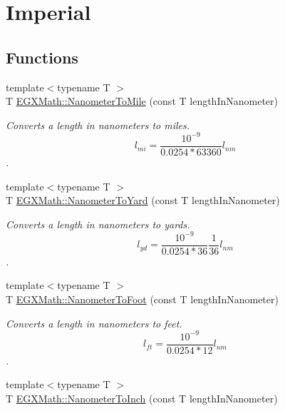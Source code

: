 \hypertarget{group___e_g_x_math-_conversions-_length_conversions-_nanometer-_imperial}{}\section{Imperial}
\label{group___e_g_x_math-_conversions-_length_conversions-_nanometer-_imperial}
\subsection*{Functions}
\begin{DoxyCompactItemize}
\item 
{\footnotesize template$<$typename T $>$ }\\T \mbox{\hyperlink{group___e_g_x_math-_conversions-_length_conversions-_nanometer-_imperial_gadbf1e269e14b8afcd128aa5534f28a5e}{E\+G\+X\+Math\+::\+Nanometer\+To\+Mile}} (const T length\+In\+Nanometer)
\begin{DoxyCompactList}\small\item\em Converts a length in nanometers to miles. \[ l_{mi}=\frac{10^{-9}}{0.0254 * 63360} l_{nm} \]. \end{DoxyCompactList}\item 
{\footnotesize template$<$typename T $>$ }\\T \mbox{\hyperlink{group___e_g_x_math-_conversions-_length_conversions-_nanometer-_imperial_ga1f2313a0bf1527690778a6dace0db853}{E\+G\+X\+Math\+::\+Nanometer\+To\+Yard}} (const T length\+In\+Nanometer)
\begin{DoxyCompactList}\small\item\em Converts a length in nanometers to yards. \[ l_{yd}= \frac{10^{-9}}{0.0254 * 36} \frac{1}{36} l_{nm} \]. \end{DoxyCompactList}\item 
{\footnotesize template$<$typename T $>$ }\\T \mbox{\hyperlink{group___e_g_x_math-_conversions-_length_conversions-_nanometer-_imperial_ga7c6124e07aa11d37695c96c5a520197d}{E\+G\+X\+Math\+::\+Nanometer\+To\+Foot}} (const T length\+In\+Nanometer)
\begin{DoxyCompactList}\small\item\em Converts a length in nanometers to feet. \[ l_{ft}= \frac{10^{-9}}{0.0254 * 12} l_{nm} \]. \end{DoxyCompactList}\item 
{\footnotesize template$<$typename T $>$ }\\T \mbox{\hyperlink{group___e_g_x_math-_conversions-_length_conversions-_nanometer-_imperial_ga8b72dde5616da5be31e8054f1facc501}{E\+G\+X\+Math\+::\+Nanometer\+To\+Inch}} (const T length\+In\+Nanometer)

\end{DoxyCompactItemize}
